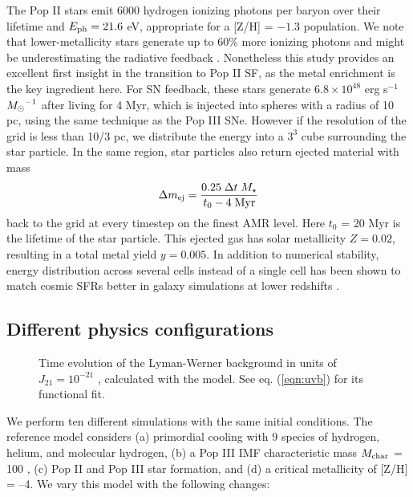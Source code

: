 \documentclass[useAMS,usenatbib]{mn2e}
\begin{document}
The Pop II stars emit 6000 hydrogen ionizing photons per baryon over
their lifetime and $E_{\rm ph} = 21.6$ eV, appropriate for a [Z/H] =
$-1.3$ population.  We note that lower-metallicity stars generate up
to 60\% more ionizing photons and might be underestimating the
radiative feedback \citep{Schaerer03}.  Nonetheless this study
provides an excellent first insight in the transition to Pop II SF, as
the metal enrichment is the key ingredient here.  For SN feedback,
these stars generate $6.8 \times 10^{48}$ erg s$^{-1}$ $\Ms^{-1}$
after living for 4 Myr, which is injected into spheres with a radius
of 10 pc, using the same technique as the Pop III SNe.  However if the
resolution of the grid is less than 10/3 pc, we distribute the energy
into a $3^3$ cube surrounding the star particle.  In the same region,
star particles also return ejected material with mass
%
\begin{equation}
  \label{eqn:SNmass}
  \Delta m_{\rm ej} = \frac{0.25 \; \Delta t \; M_\star} 
         {t_0 - 4\;\mathrm{Myr}}
\end{equation}
back to the grid at every timestep on the finest AMR level.  Here
$t_0$ = 20 Myr is the lifetime of the star particle.  This ejected gas
has solar metallicity $Z = 0.02$, resulting in a total metal yield $y
= 0.005$.  In addition to numerical stability, energy distribution
across several cells instead of a single cell has been shown to match
cosmic SFRs better in galaxy simulations at lower redshifts
\citep{Smith10}.

\subsection{Different physics configurations}
\label{sec:config}

\begin{figure}
  \caption{\label{fig:uvb} Time evolution of the Lyman-Werner
    background in units of $J_{21} = 10^{-21}$ \emis, calculated with
    the \citet{Wise05} model.  See eq. (\ref{eqn:uvb}) for its
    functional fit.}
\end{figure}

We perform ten different simulations with the same initial conditions.
The reference model considers (a) primordial cooling with 9 species of
hydrogen, helium, and molecular hydrogen, (b) a Pop III IMF
characteristic mass $M_{\rm char}$ = 100 \Ms, (c) Pop II and Pop III
star formation, and (d) a critical metallicity of [Z/H] = --4.  We
vary this model with the following changes:
\end{document}
